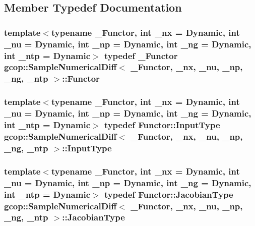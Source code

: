 \subsection{\-Member \-Typedef \-Documentation}
\subsubsection[{\-Functor}]{\setlength{\rightskip}{0pt plus 5cm}template$<$typename \-\_\-\-Functor, int \-\_\-nx = \-Dynamic, int \-\_\-nu = \-Dynamic, int \-\_\-np = \-Dynamic, int \-\_\-ng = \-Dynamic, int \-\_\-ntp = \-Dynamic$>$ typedef \-\_\-\-Functor {\bf gcop\-::\-Sample\-Numerical\-Diff}$<$ \-\_\-\-Functor, \-\_\-nx, \-\_\-nu, \-\_\-np, \-\_\-ng, \-\_\-ntp $>$\-::{\bf \-Functor}}\label{classgcop_1_1SampleNumericalDiff_a4835e32a278d63e2bee65f23ef313ec6}
\subsubsection[{\-Input\-Type}]{\setlength{\rightskip}{0pt plus 5cm}template$<$typename \-\_\-\-Functor, int \-\_\-nx = \-Dynamic, int \-\_\-nu = \-Dynamic, int \-\_\-np = \-Dynamic, int \-\_\-ng = \-Dynamic, int \-\_\-ntp = \-Dynamic$>$ typedef {\bf \-Functor\-::\-Input\-Type} {\bf gcop\-::\-Sample\-Numerical\-Diff}$<$ \-\_\-\-Functor, \-\_\-nx, \-\_\-nu, \-\_\-np, \-\_\-ng, \-\_\-ntp $>$\-::{\bf \-Input\-Type}}\label{classgcop_1_1SampleNumericalDiff_abe57353239cbe7da89c147b6903b2419}
\subsubsection[{\-Jacobian\-Type}]{\setlength{\rightskip}{0pt plus 5cm}template$<$typename \-\_\-\-Functor, int \-\_\-nx = \-Dynamic, int \-\_\-nu = \-Dynamic, int \-\_\-np = \-Dynamic, int \-\_\-ng = \-Dynamic, int \-\_\-ntp = \-Dynamic$>$ typedef {\bf \-Functor\-::\-Jacobian\-Type} {\bf gcop\-::\-Sample\-Numerical\-Diff}$<$ \-\_\-\-Functor, \-\_\-nx, \-\_\-nu, \-\_\-np, \-\_\-ng, \-\_\-ntp $>$\-::{\bf \-Jacobian\-Type}}\label{classgcop_1_1SampleNumericalDiff_ad6f4dee92f22c4eed176cbf356896d10}
